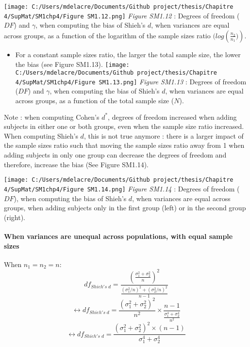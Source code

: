 \documentclass[
  english,
  man,mask,floatsintext]{apa6}
\providecommand{\tightlist}{%
  \setlength{\itemsep}{0pt}\setlength{\parskip}{0pt}}
\let\oldparagraph\paragraph
\renewcommand{\paragraph}[1]{\oldparagraph{#1}\mbox{}}
\begin{document}
\texttt{[image: C:/Users/mdelacre/Documents/Github project/thesis/Chapitre 4/SupMat/SM1chp4/Figure SM1.12.png]}
\emph{Figure SM1.12} : Degrees of freedom (\(DF\)) and \(\gamma\), when computing the bias of Shieh's \(d\), when variances are equal across groups, as a function of the logarithm of the sample sizes ratio \((log \left(\frac{n_2}{n_1})\right)\).

\newpage

\begin{itemize}
\tightlist
\item
  For a constant sample sizes ratio, the larger the total sample size, the lower the bias (see Figure SM1.13).
  \texttt{[image: C:/Users/mdelacre/Documents/Github project/thesis/Chapitre 4/SupMat/SM1chp4/Figure SM1.13.png]}
  \emph{Figure SM1.13} : Degrees of freedom (\(DF\)) and \(\gamma\), when computing the bias of Shieh's \(d\), when variances are equal across groups, as a function of the total sample size (\(N\)).
\end{itemize}

\newpage

Note : when computing Cohen's \(d^*\), degrees of freedom increased when adding subjects in either one or both groups, even when the sample size ratio increased. When computing Shieh's \(d\), this is not true anymore : there is a larger impact of the sample sizes ratio such that moving the sample sizes ratio away from 1 when adding subjects in only one group can decrease the degrees of freedom and therefore, increase the bias (See Figure SM1.14).

\texttt{[image: C:/Users/mdelacre/Documents/Github project/thesis/Chapitre 4/SupMat/SM1chp4/Figure SM1.14.png]}
\emph{Figure SM1.14} : Degrees of freedom (\(DF\)), when computing the bias of Shieh's \(d\), when variances are equal across groups, when adding subjects only in the first group (left) or in the second group (right).

\newpage

\hypertarget{when-variances-are-unequal-across-populations-with-equal-sample-sizes-1}{%
\paragraph{When variances are unequal across populations, with equal sample sizes}\label{when-variances-are-unequal-across-populations-with-equal-sample-sizes-1}}

When \(n_1=n_2=n\):
\[df_{Shieh's \; d} = \frac{\left( \frac{\sigma_1^2+\sigma_2^2}{n} \right)^2}{\frac{(\sigma_1^2/n)^2+(\sigma_2^2/n)^2}{n-1}}\]
\[\leftrightarrow df_{Shieh's \; d} = \frac{(\sigma_1^2+\sigma_2^2)^2}{n^2} \times\frac{n-1}{\frac{\sigma_1^4+\sigma_2^4}{n^2}}\]
\[\leftrightarrow df_{Shieh's \; d} = \frac{(\sigma_1^2+\sigma_2^2)^2 \times (n-1)}{\sigma_1^4+\sigma_2^4}\]
\end{document}
